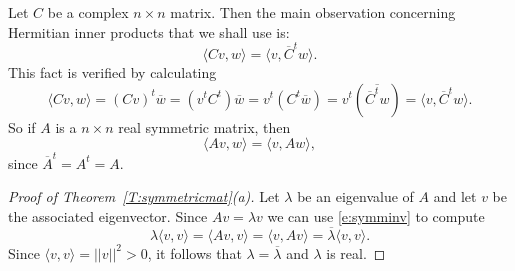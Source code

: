 \documentclass{ximera}
\begin{document}
Let $C$ be a complex $n\times n$ matrix.  Then the main observation
concerning Hermitian inner products that we shall use is:
\[
\langle Cv,w \rangle = \langle v,\overline{C}^tw \rangle.
\]
This fact is verified by calculating
\[
\langle Cv,w \rangle = (Cv)^t\overline{w} = (v^tC^t)\overline{w}
= v^t(C^t\overline{w}) = v^t(\overline{\overline{C}^tw})
= \langle v,\overline{C}^tw \rangle.
\]
So if $A$ is a $n\times n$ real symmetric matrix, then
\begin{equation}   \label{e:symminv}
\langle Av,w \rangle = \langle v,Aw \rangle,
\end{equation}
since $\overline{A}^t= A^t = A$.

\begin{proof}[Proof of Theorem~\ref{T:symmetricmat}(a)]  Let $\lambda$
be an eigenvalue of $A$ and let $v$ be the associated eigenvector. Since
$Av=\lambda v$ we can use \eqref{e:symminv} to compute
\[
\lambda \langle v,v \rangle = \langle Av,v \rangle = \langle v,Av \rangle
= \overline{\lambda} \langle v,v \rangle.
\]
Since $\langle v,v \rangle = ||v||^2 > 0$, it follows that
$\lambda=\overline{\lambda}$ and $\lambda$ is real.  \end{proof}
\end{document}
